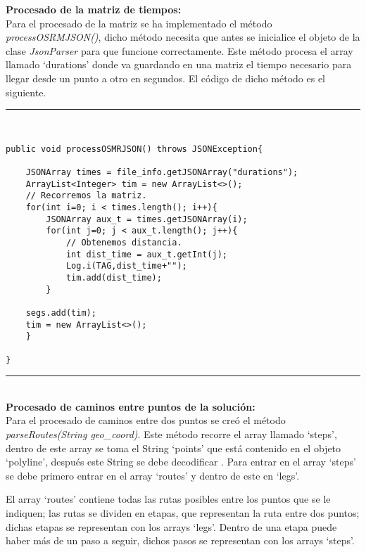 \vspace{0.06in}
\textbf{Procesado de la matriz de tiempos:}\\
Para el procesado de la matriz se ha implementado el método \textit{processOSRMJSON()}, dicho método necesita que antes se inicialice el objeto de la clase \textit{JsonParser} para que funcione correctamente.
Este método procesa el array llamado \enquote*{durations} donde va guardando en una matriz el tiempo necesario para llegar desde un punto a otro en segundos. El código de dicho método es el siguiente.
\newpage
\noindent\rule[-1ex]{\textwidth}{1pt}\\
\begin{lstlisting}[caption=Función para procesar matriz de tiempos entre puntos.]
public void processOSMRJSON() throws JSONException{

	JSONArray times = file_info.getJSONArray("durations");
	ArrayList<Integer> tim = new ArrayList<>();
	// Recorremos la matriz.
	for(int i=0; i < times.length(); i++){
		JSONArray aux_t = times.getJSONArray(i);
		for(int j=0; j < aux_t.length(); j++){
			// Obtenemos distancia.
			int dist_time = aux_t.getInt(j);
			Log.i(TAG,dist_time+"");
			tim.add(dist_time);
		}
	
	segs.add(tim);
	tim = new ArrayList<>();
	}

}
\end{lstlisting}
\noindent\rule[-1ex]{\textwidth}{1pt}\\

\vspace{0.06in}
\textbf{Procesado de caminos entre puntos de la solución:}\\
Para el procesado de caminos entre dos puntos se creó el método \textit{parseRoutes(String geo\_coord)}. Este método recorre el array llamado \enquote*{steps}, dentro de este array se toma el String \enquote*{points} que está contenido en el objeto \enquote*{polyline}, después este String se debe decodificar \cite{decode_polyline}. Para entrar en el array \enquote*{steps} se debe primero entrar en el array \enquote*{routes} y dentro de este en \enquote*{legs}.\newline

El array \enquote*{routes} contiene todas las rutas posibles entre los puntos que se le indiquen; las rutas se dividen en etapas, que representan la ruta entre dos puntos; dichas etapas se representan con los arrays \enquote*{legs}. Dentro de una etapa puede haber más de un paso a seguir, dichos pasos se representan con los arrays \enquote*{steps}.\newline

